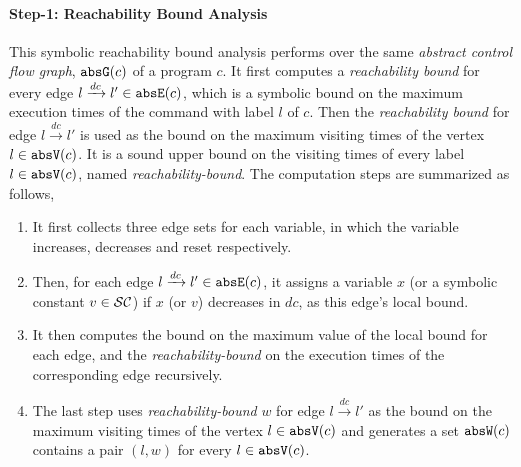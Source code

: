 \paragraph{Step-1: Reachability Bound Analysis}
This symbolic reachability bound analysis performs over the same \emph{abstract control flow graph}, $\mathtt{abs}{\mathtt{G}}(c)$ of a program $c$. 
It first computes a \emph{reachability bound} for every edge $l \xrightarrow{dc} l' \in \mathtt{abs}{\mathtt{E}}(c)$,
which is a symbolic bound on the maximum execution times of the command with label $l$ of $c$.
Then the \emph{reachability bound} for edge $l \xrightarrow{dc} l'$ is used as the bound on the maximum visiting times of the vertex $l \in \mathtt{abs}{\mathtt{V}}(c)$.
It is a sound upper bound on the visiting times
of every label $l \in \mathtt{abs}{\mathtt{V}}(c)$, named \emph{reachability-bound}.
The computation steps are 
summarized as follows,
\begin{enumerate}
  \item It first collects three edge sets for each variable,
in which the variable increases, decreases and reset respectively.
\item
Then, for each edge  $l \xrightarrow{dc} l' \in \mathtt{abs}{\mathtt{E}}(c)$, it assigns a variable $x$ (or a symbolic constant $v \in \mathcal{SC}$) if $x$ (or $v$) decreases in $dc$, as this edge's local bound.
\item
It then computes the bound on the maximum value of the local bound for each edge,
and the \emph{reachability-bound} on the execution
times of the corresponding edge recursively.
\item The last step uses \emph{reachability-bound} $w$ for edge $l \xrightarrow{dc} l'$ as the bound on the maximum visiting times of the vertex $l \in \mathtt{abs}{\mathtt{V}}(c)$ and generates a set $\mathtt{abs}{\mathtt{W}}(c)$ contains a pair $(l, w)$ for every $l \in \mathtt{abs}{\mathtt{V}}(c)$.
\end{enumerate}

